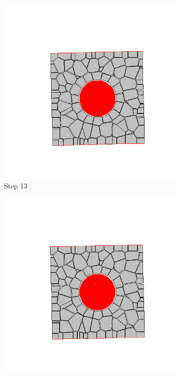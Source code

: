 \begin{figure}[ht!]
      \begin{subfigure}{.25\textwidth}
        \centering
        \includegraphics[width=1.0\linewidth]{Files/Small_DEF/CR/DEP5-STEP(013).png}
      \caption{Step 13}
      \end{subfigure}%
      \begin{subfigure}{.25\textwidth}
        \centering
        \includegraphics[width=1.0\linewidth]{Files/Small_DEF/CR/DEP5-STEP(014).png}

\end{subfigure}
\end{figure}
